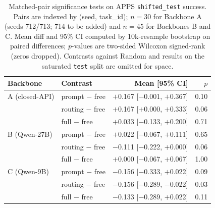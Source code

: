 \begin{table}[t]
\centering
\small
\setlength{\tabcolsep}{4pt}
\begin{tabular}{llrr}
\toprule
Backbone & Contrast & Mean [95\% CI] & $p$ \\
\midrule
A (closed-API) & prompt $-$ free    & $+$0.167 [$-$0.001, $+$0.367] & 0.10 \\
               & routing $-$ free   & $+$0.167 [$+$0.000, $+$0.333] & 0.06 \\
               & full $-$ free      & $+$0.033 [$-$0.133, $+$0.200] & 0.71 \\
\midrule
B (Qwen-27B)   & prompt $-$ free    & $+$0.022 [$-$0.067, $+$0.111] & 0.65 \\
               & routing $-$ free   & $-$0.111 [$-$0.222, $+$0.000] & 0.06 \\
               & full $-$ free      & $+$0.000 [$-$0.067, $+$0.067] & 1.00 \\
\midrule
C (Qwen-9B)    & prompt $-$ free    & $-$0.156 [$-$0.333, $+$0.022] & 0.09 \\
               & routing $-$ free   & $-$0.156 [$-$0.289, $-$0.022] & 0.03 \\
               & full $-$ free      & $-$0.133 [$-$0.289, $+$0.022] & 0.11 \\
\bottomrule
\end{tabular}
\caption{Matched-pair significance tests on APPS \texttt{shifted\_test} success. Pairs are indexed by (seed, task\_id); $n=30$ for Backbone A (seeds 712/713; 714 to be added) and $n=45$ for Backbones B and C. Mean diff and 95\% CI computed by 10k-resample bootstrap on paired differences; $p$-values are two-sided Wilcoxon signed-rank (zeros dropped). Contrasts against Random and results on the saturated \texttt{test} split are omitted for space.}
\label{tab:apps-significance}
\end{table}

